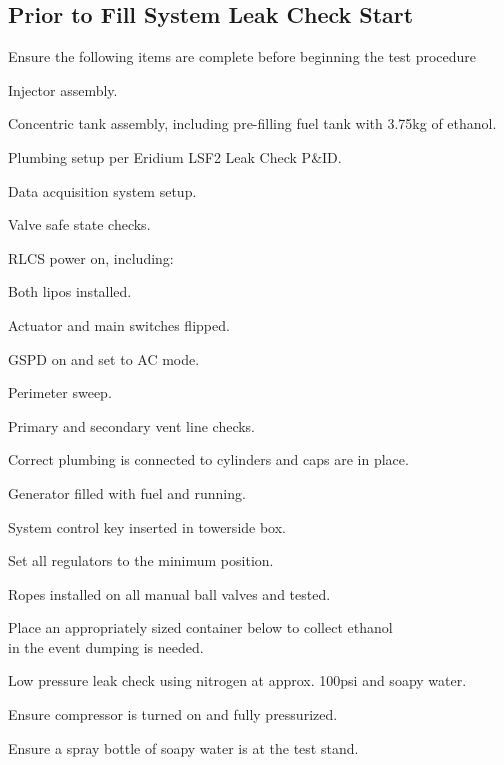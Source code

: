 \subsection{Prior to Fill System Leak Check Start}
\begin{checklist}
    \item Ensure the following items are complete before beginning the test procedure
    \begin{checklist}
        \item Injector assembly.
        \item Concentric tank assembly, including pre-filling fuel tank with 3.75kg of ethanol.
        \item Plumbing setup per Eridium LSF2 Leak Check P\&ID.
        \item Data acquisition system setup.
        \item Valve safe state checks.
        \item RLCS power on, including:
        \begin{checklist}
        \item Both lipos installed.
        \item Actuator and main switches flipped.
        \item GSPD on and set to AC mode.
        \end{checklist}
        \item Perimeter sweep. 
        \item Primary and secondary vent line checks.
        \item Correct plumbing is connected to cylinders and caps are in place.
        \item Generator filled with fuel and running. 
        \item System control key inserted in towerside box.
        \item Set all regulators to the minimum position. 
        \item Ropes installed on all manual ball valves and tested. 
        \item Place an appropriately sized container below \fdrain{} to collect ethanol \\ \phantom{} \hspace{8ex} in the event dumping is needed.
        \item Low pressure leak check using nitrogen at approx. 100psi and soapy water. 
        \item Ensure compressor is turned on and fully pressurized.
        \item Ensure a spray bottle of soapy water is at the test stand.

\end{checklist}
\end{checklist}
